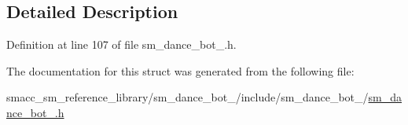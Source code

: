 \subsection{Detailed Description}


Definition at line 107 of file sm\+\_\+dance\+\_\+bot\+\_.\+h.



The documentation for this struct was generated from the following file\+:\begin{DoxyCompactItemize}
\item 
smacc\+\_\+sm\+\_\+reference\+\_\+library/sm\+\_\+dance\+\_\+bot\+\_/include/sm\+\_\+dance\+\_\+bot\+\_/\hyperlink{sm__dance__bot__2_8h}{sm\+\_\+dance\+\_\+bot\+\_.\+h}\end{DoxyCompactItemize}
